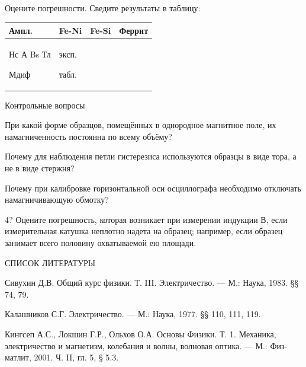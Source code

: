 \documentclass[]{article}
\begin{document}
Оцените погрешности. Сведите результаты в таблицу:

\begin{longtable}[]{@{}llll@{}}
\toprule
Ампл. & Fe-Ni & Fe-Si & Феррит\tabularnewline
\midrule
\endhead
\begin{minipage}[t]{0.24\columnwidth}\raggedright\strut
Нс А Bs Тл

Мдиф\strut
\end{minipage} & \begin{minipage}[t]{0.24\columnwidth}\raggedright\strut
эксп.

табл.\strut
\end{minipage} & \begin{minipage}[t]{0.24\columnwidth}\raggedright\strut
\strut
\end{minipage} & \begin{minipage}[t]{0.24\columnwidth}\raggedright\strut
\strut
\end{minipage}\tabularnewline
\bottomrule
\end{longtable}

\protect\hypertarget{bookmark67}{}{}Контрольные вопросы

При какой форме образцов, помещённых в однородное магнитное поле, их
намагниченность постоянна по всему объёму?

Почему для наблюдения петли гистерезиса используются образцы в виде
тора, а не в виде стержня?

Почему при калибровке горизонтальной оси осциллографа необходимо
от­ключать намагничивающую обмотку?

4? Оцените погрешность, которая возникает при измерении индукции В, если
измерительная катушка неплотно надета на образец; например, если образец
занимает всего половину охватываемой ею площади.

СПИСОК ЛИТЕРАТУРЫ

Сивухин Д.В. Общий курс физики. Т. III. Электричество. --- М.: Наука,
1983. §§ 74, 79.

Калашников С.Г. Электричество. --- М.: Наука, 1977. §§ 110, 111, 119.

Кингсеп А.С., Локшин Г.Р., Ольхов О.А. Основы Физики. Т. 1. Механика,
электричество и магнетизм, колебания и волны, волновая оптика. --- М.:
Физ- матлит, 2001. Ч. II, гл. 5, § 5.3.
\end{document}
